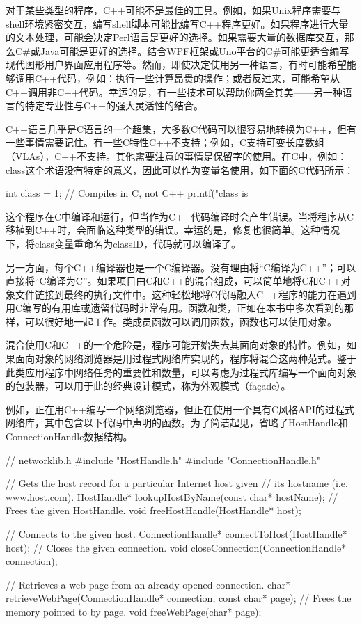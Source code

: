 
对于某些类型的程序，C++可能不是最佳的工具。例如，如果Unix程序需要与shell环境紧密交互，编写shell脚本可能比编写C++程序更好。如果程序进行大量的文本处理，可能会决定Perl语言是更好的选择。如果需要大量的数据库交互，那么C\#或Java可能是更好的选择。结合WPF框架或Uno平台的C\#可能更适合编写现代图形用户界面应用程序等。然而，即使决定使用另一种语言，有时可能希望能够调用C++代码，例如：执行一些计算昂贵的操作；或者反过来，可能希望从C++调用非C++代码。幸运的是，有一些技术可以帮助你两全其美——另一种语言的特定专业性与C++的强大灵活性的结合。


C++语言几乎是C语言的一个超集，大多数C代码可以很容易地转换为C++，但有一些事情需要记住。有一些C特性C++不支持；例如，C支持可变长度数组（VLAs），C++不支持。其他需要注意的事情是保留字的使用。在C中，例如：class这个术语没有特定的意义，因此可以作为变量名使用，如下面的C代码所示：

\begin{cpp}
int class = 1; // Compiles in C, not C++
printf("class is %
\end{cpp}

这个程序在C中编译和运行，但当作为C++代码编译时会产生错误。当将程序从C移植到C++时，会面临这种类型的错误。幸运的是，修复也很简单。这种情况下，将class变量重命名为classID，代码就可以编译了。

另一方面，每个C++编译器也是一个C编译器。没有理由将“C编译为C++”；可以直接将“C编译为C”。如果项目由C和C++的混合组成，可以简单地将C和C++对象文件链接到最终的执行文件中。这种轻松地将C代码融入C++程序的能力在遇到用C编写的有用库或遗留代码时非常有用。函数和类，正如在本书中多次看到的那样，可以很好地一起工作。类成员函数可以调用函数，函数也可以使用对象。


混合使用C和C++的一个危险是，程序可能开始失去其面向对象的特性。例如，如果面向对象的网络浏览器是用过程式网络库实现的，程序将混合这两种范式。鉴于此类应用程序中网络任务的重要性和数量，可以考虑为过程式库编写一个面向对象的包装器，可以用于此的经典设计模式，称为外观模式（façade）。

例如，正在用C++编写一个网络浏览器，但正在使用一个具有C风格API的过程式网络库，其中包含以下代码中声明的函数。为了简洁起见，省略了HostHandle和ConnectionHandle数据结构。

\begin{cpp}
// networklib.h
#include "HostHandle.h"
#include "ConnectionHandle.h"

// Gets the host record for a particular Internet host given
// its hostname (i.e. www.host.com).
HostHandle* lookupHostByName(const char* hostName);
// Frees the given HostHandle.
void freeHostHandle(HostHandle* host);

// Connects to the given host.
ConnectionHandle* connectToHost(HostHandle* host);
// Closes the given connection.
void closeConnection(ConnectionHandle* connection);

// Retrieves a web page from an already-opened connection.
char* retrieveWebPage(ConnectionHandle* connection, const char* page);
// Frees the memory pointed to by page.
void freeWebPage(char* page);
\end{cpp}

